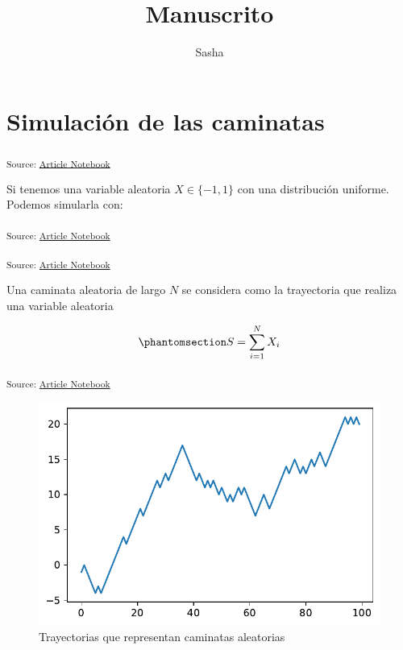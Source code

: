 \documentclass[
  letterpaper,
  DIV=11,
  numbers=noendperiod]{scrartcl}
\title{Manuscrito}
\author{Sasha}
\date{}
\begin{document}
\maketitle


\section{Simulación de las
caminatas}\label{simulaciuxf3n-de-las-caminatas}

\textsubscript{Source:
\href{https://akielbowicz.github.io/pyday-la-plata-2024/index.qmd.html}{Article
Notebook}}

Si tenemos una variable aleatoria \(X \in \{-1,1\}\) con una
distribución uniforme. Podemos simularla con:

\textsubscript{Source:
\href{https://akielbowicz.github.io/pyday-la-plata-2024/index.qmd.html}{Article
Notebook}}

\textsubscript{Source:
\href{https://akielbowicz.github.io/pyday-la-plata-2024/index.qmd.html}{Article
Notebook}}

Una caminata aleatoria de largo \(N\) se considera como la trayectoria
que realiza una variable aleatoria

\begin{equation}\phantomsection\label{eq-caminata-aleatoria}{
S = \sum_{i=1}^{N} X_{i}
}\end{equation}

\textsubscript{Source:
\href{https://akielbowicz.github.io/pyday-la-plata-2024/index.qmd.html}{Article
Notebook}}

\begin{figure}[H]

{\centering \includegraphics{index_files/figure-pdf/cell-4-output-1.pdf}

}

\caption{Trayectorias que representan caminatas aleatorias}

\end{figure}%
\end{document}
